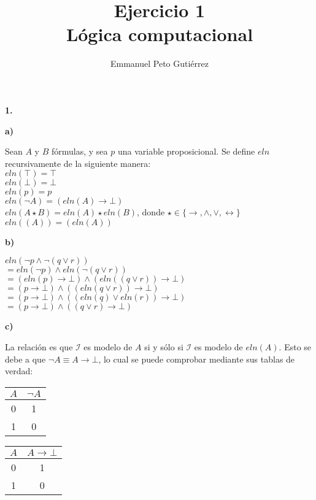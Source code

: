 \documentclass{article}
\title{Ejercicio 1\\Lógica computacional}
\author{Emmanuel Peto Gutiérrez}
\begin{document}
\maketitle

\textbf{1.}

\textbf{a)}

Sean $A$ y $B$ fórmulas, y sea $p$ una variable proposicional. Se define $eln$ recursivamente de la siguiente manera:\\
$eln(\top) = \top$\\
$eln(\bot) = \bot$\\
$eln(p) = p$\\
$eln(\lnot A) = (eln(A) \rightarrow \bot)$\\
$eln(A \star B) = eln(A) \star eln(B)$, donde $\star \in \{\rightarrow, \land, \lor, \leftrightarrow\}$\\
$eln((A)) = (eln(A))$

\vspace{5mm}

\textbf{b)}

$eln(\lnot p \land \lnot (q \lor r))$\\
$ = eln(\lnot p) \land eln(\lnot (q \lor r))$\\
$ = (eln(p) \rightarrow \bot) \land (eln((q \lor r)) \rightarrow \bot)$\\
$ = (p \rightarrow \bot) \land ((eln(q \lor r)) \rightarrow \bot)$\\
$ = (p \rightarrow \bot) \land ((eln(q) \lor eln(r)) \rightarrow \bot)$\\
$ = (p \rightarrow \bot) \land ((q \lor r) \rightarrow \bot)$

\vspace{5mm}

\textbf{c)}

La relación es que $\mathcal{I}$ es modelo de $A$ si y sólo si $\mathcal{I}$ es modelo de $eln(A)$. Esto se debe a que $\lnot A \equiv A \rightarrow \bot$, lo cual se puede comprobar mediante sus tablas de verdad:\\

\begin{tabular}{|c|c|}
\hline
$A$ & $\lnot A$ \\ \hline
0 & 1 \\ \hline
1 & 0 \\ \hline
\end{tabular}
\hspace{5mm}
\begin{tabular}{|c|c|}
\hline
$A$ & $A \rightarrow \bot$ \\ \hline
0 & 1 \\ \hline
1 & 0 \\ \hline
\end{tabular}
\end{document}
